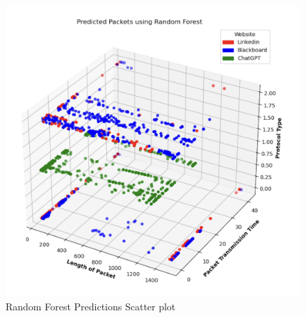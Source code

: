 \documentclass[10pt,sigconf,letterpaper,nonacm]{acmart}
\begin{document}
\begin{figure}[!h]
  \centering
  \includegraphics[width=1\linewidth]{Figures_and_Graphs/PredictedPacketsScatterRF.png}
  \caption{Random Forest Predictions Scatter plot}
  \label{fig:rf_scatter}
\end{figure}





\cite{10.1145/2388576.2388608}
\cite{10.5555/3432601.3432608}
\cite{10.1109/TNET.2014.2320577}
\cite{scikit-learn}
\cite{Wireshark}
\end{document}
